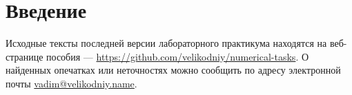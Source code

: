 \section*{Введение}

\lipsum[1-7]

Исходные тексты последней версии лабораторного практикума находятся на
веб-странице пособия —
\url{https://github.com/velikodniy/numerical-tasks}. О найденных
опечатках или неточностях можно сообщить по адресу электронной почты
\href{mailto:vadim@veikodniy.name}{vadim@velikodniy.name}.
